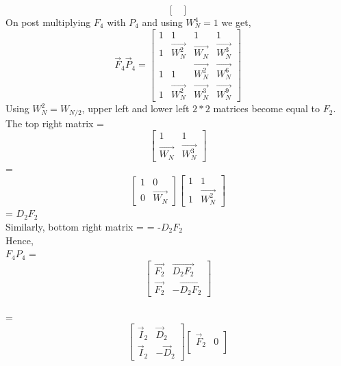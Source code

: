 \documentclass[journal,12pt,twocolumn]{IEEEtran}
\renewcommand\thesection{\arabic{section}}
\begin{document}
\begin{enumerate}[label=\arabic*.,ref=\thesection.\theenumi]
\begin{solution}
\begin{equation}
\begin{bmatrix}
	\end{bmatrix}
\end{equation}
On post multiplying $F_{4}$ with $P_{4}$  and using $W_{N}^{4} = 1$ we get,
\begin{equation}
	\vec{F}_{4}\vec{P}_{4}=
	\begin{bmatrix}
		1 & 1 & 1 & 1 \\
		1 & \vec{W_{N}^2} & \vec{W_{N}} & \vec{W_{N}^{3}}\\
		1 & 1 & \vec{W_{N}^{2}} & \vec{W_{N}^{6}}\\
		1 & \vec{W_{N}^{2}} & \vec{W_{N}^{3}} & \vec{W_{N}^{9}}
	\end{bmatrix}
\end{equation}
Using $W_{N}^{2} = W_{N/2}$, upper left and lower left $2*2$ matrices
become equal to $F_{2}$. The top right matrix =
\begin{equation}
	\begin{bmatrix}
		1 & 1 \\
		\vec{W_{N}} & \vec{W_{N}^{3}}
	\end{bmatrix}
\end{equation}
=
\begin{equation}
	\begin{bmatrix}
		1 & 0 \\
		0 & \vec{W_{N}}
	\end{bmatrix}
	\begin{bmatrix}
		1 & 1 \\
		1 & \vec{W_{N}^{2}}
	\end{bmatrix}
\end{equation}
= ${D_{2}}{F_{2}}$
\\
Similarly, bottom right matrix = 
= -${D_{2}}{F_{2}}$
\\
Hence,
\\${F_{4}{P_{4}}}$ = 
\begin{equation}
	\begin{bmatrix}
		\vec{F_{2}} & \vec{D_{2}F_{2}} \\
		\vec{F_{2}} & -\vec{D_{2}F_{2}}
	\end{bmatrix}
\end{equation}
\\=
\begin{equation}
\begin{bmatrix}
	\vec{I}_{2} & \vec{D}_{2} \\
\vec{I}_{2} & -\vec{D}_{2}
\end{bmatrix}
\begin{bmatrix}
\vec{F}_{2} & 0 \\

\end{bmatrix}
\end{equation}
\end{solution}
\end{enumerate}
\end{document}
